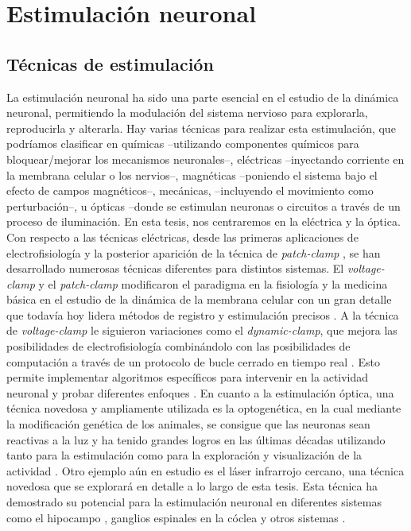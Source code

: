 \section{Estimulación neuronal}
\subsection{Técnicas de estimulación}

La estimulación neuronal ha sido una parte esencial en el estudio de la dinámica neuronal, permitiendo la modulación del sistema nervioso para explorarla, reproducirla y alterarla. Hay varias técnicas para realizar esta estimulación, que podríamos clasificar en químicas --utilizando componentes químicos para bloquear/mejorar los mecanismos neuronales--, eléctricas --inyectando corriente en la membrana celular o los nervios--, magnéticas --poniendo el sistema bajo el efecto de campos magnéticos--, mecánicas, --incluyendo el movimiento como perturbación--, u ópticas --donde se estimulan neuronas o circuitos a través de un proceso de iluminación. En esta tesis, nos centraremos en la eléctrica y la óptica. Con respecto a las técnicas eléctricas, desde las primeras aplicaciones de electrofisiología \parencite{marmont_studies_1949,cole_ions_1955,neher_singlechannel_1976} y la posterior aparición de la técnica de \textit{patch-clamp} \textcite{hamill_improved_1981}, se han desarrollado numerosas técnicas diferentes para distintos sistemas. El \textit{voltage-clamp} y el \textit{patch-clamp} modificaron el paradigma en la fisiología y la medicina básica en el estudio de la dinámica de la membrana celular con un gran detalle que todavía hoy lidera métodos de registro y estimulación precisos \parencite{hamill_improved_1981}. A la técnica de \textit{voltage-clamp} le siguieron variaciones como el \textit{dynamic-clamp}, que mejora las posibilidades de electrofisiología combinándolo con las posibilidades de computación a través de un protocolo de bucle cerrado en tiempo real \parencite{nowotny_dynamic_2022}. Esto permite implementar algoritmos específicos para intervenir en la actividad neuronal y probar diferentes enfoques \parencite{chamorro_generalization_2012}. En cuanto a la estimulación óptica, una técnica novedosa y ampliamente utilizada es la optogenética, en la cual mediante la modificación genética de los animales, se consigue que las neuronas sean reactivas a la luz y ha tenido grandes logros en las últimas décadas utilizando tanto para la estimulación como para la exploración y visualización de la actividad \parencite{chen_roles_2022}. Otro ejemplo aún en estudio es el láser infrarrojo cercano, una técnica novedosa que se explorará en detalle a lo largo de esta tesis. Esta técnica ha demostrado su potencial para la estimulación neuronal en diferentes sistemas como el hipocampo \parencite{liang_temperaturedependent_2009}, ganglios espinales en la cóclea \parencite{goyal_acute_2012, barrett_pulsed_2018, brown_thermal_2020} y otros sistemas \parencite{shapiro_infrared_2012, cayce_infrared_2014, begeng_activity_2022}.

